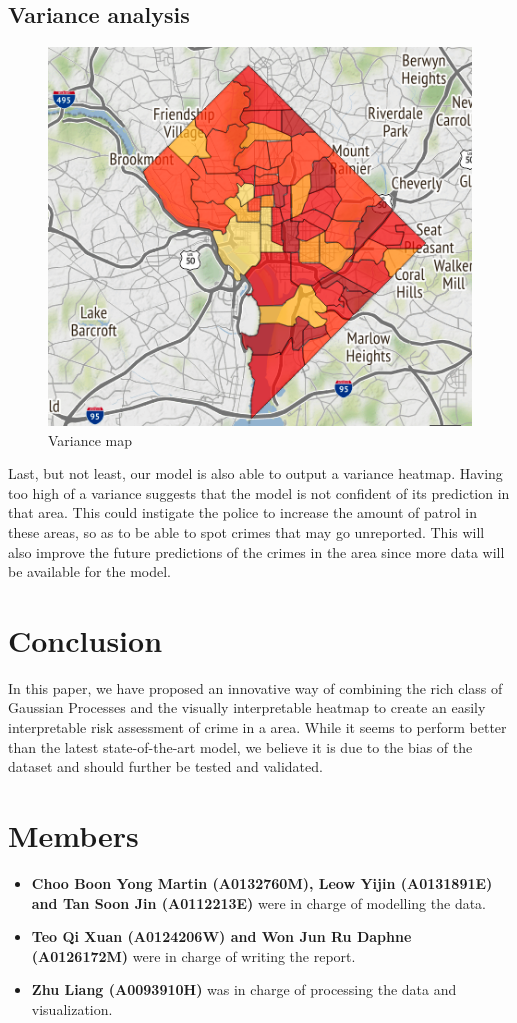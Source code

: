 \documentclass[letterpaper]{article}
\begin{document}
	\subsection{Variance analysis}
	\begin{figure}[!ht]
		\includegraphics[width=\linewidth]{./w22_variance.png}
		\caption{Variance map}
		\label{p5}
	\end{figure}
	Last, but not least, our model is also able to output a variance heatmap. Having too high of a variance suggests that the model is not confident of its prediction in that area. This could instigate the police to increase the amount of patrol in these areas, so as to be able to spot crimes that may go unreported. This will also improve the future predictions of the crimes in the area since more data will be available for the model.
	
	\section{Conclusion}
	In this paper, we have proposed an innovative way of combining the rich class of Gaussian Processes and the visually interpretable heatmap to create an easily interpretable risk assessment of crime in a area. While it seems to perform better than the latest state-of-the-art model, we believe it is due to the bias of the dataset and should further be tested and validated.
	\section{Members}
	\begin{itemize}
		\item {\bf Choo Boon Yong Martin (A0132760M), Leow Yijin (A0131891E) and Tan Soon Jin (A0112213E)} were in charge of modelling the data.
		\item {\bf Teo Qi Xuan (A0124206W) and Won Jun Ru Daphne (A0126172M)} were in charge of writing the report.
		\item {\bf Zhu Liang (A0093910H)} was in charge of processing the data and visualization.
	\end{itemize}


	\printbibliography
\end{document}
